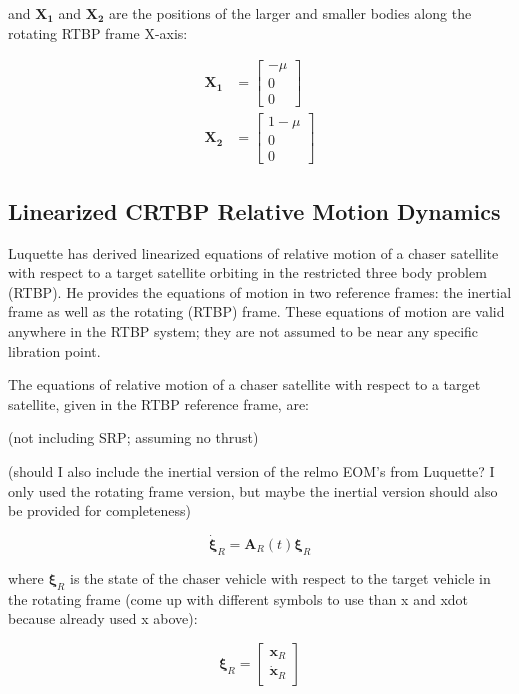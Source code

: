 \documentclass[]{article}
\begin{document}
and \(\mathbf{X_1}\) and \(\mathbf{X_2}\) are the positions of the larger and smaller bodies along the rotating RTBP frame X-axis:

\begin{equation*}
\begin{aligned}
\mathbf{X_1} &= \begin{bmatrix}
						-\mu \\ 0 \\ 0 
						\end{bmatrix} \\
\mathbf{X_2} &= \begin{bmatrix}
						1 - \mu \\ 0 \\ 0
						\end{bmatrix}
\end{aligned}
\end{equation*}

\subsection{Linearized CRTBP Relative Motion Dynamics}
Luquette has derived linearized equations of relative motion of a chaser satellite with respect to a target satellite orbiting in the restricted three body problem (RTBP).  He provides the equations of motion in two reference frames: the inertial frame as well as the rotating (RTBP) frame.  These equations of motion are valid anywhere in the RTBP system; they are not assumed to be near any specific libration point.

The equations of relative motion of a chaser satellite with respect to a target satellite, given in the RTBP reference frame, are:

(not including SRP; assuming no thrust)

(should I also include the inertial version of the relmo EOM's from Luquette?  I only used the rotating frame version, but maybe the inertial version should also be provided for completeness)

\begin{equation} \label{eq:RelmoDerivs}
\dot{\boldsymbol{\xi}}_R = \mathbf{A}_R(t)\boldsymbol{\xi}_R
\end{equation}

where \(\boldsymbol{\xi}_R\) is the state of the chaser vehicle with respect to the target vehicle in the rotating frame (come up with different symbols to use than x and xdot because already used x above):

\begin{equation*}
\boldsymbol{\xi}_R = \begin{bmatrix}
									\mathbf{x}_R \\
									\dot{\mathbf{x}}_R
									\end{bmatrix}
\end{equation*}
\end{document}
